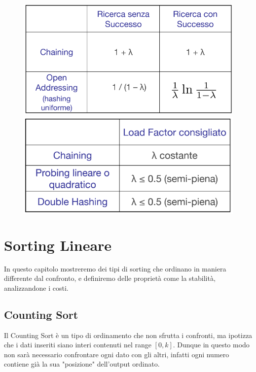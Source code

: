 \documentclass{article}
\begin{document}
    \begin{figure}[htbp]
        \center
        \includegraphics[scale=0.35]{img/openAddressingImg2.png}
        \includegraphics[scale=0.4]{img/openAddressingImg3.png}
    \end{figure}



\newpage

\section{Sorting Lineare}

In questo capitolo mostreremo dei tipi di sorting che ordinano in maniera differente dal 
confronto, e definiremo delle proprietà come la stabilità, analizzandone i costi.

\subsection{Counting Sort} Il Counting Sort è un tipo di ordinamento che non sfrutta i confronti, ma ipotizza che i dati inseriti siano interi contenuti nel range $[0,k]$. Dunque in questo modo non sarà necessario confrontare ogni dato con gli altri, infatti ogni numero contiene già la sua "posizione" dell'output ordinato.
\end{document}
